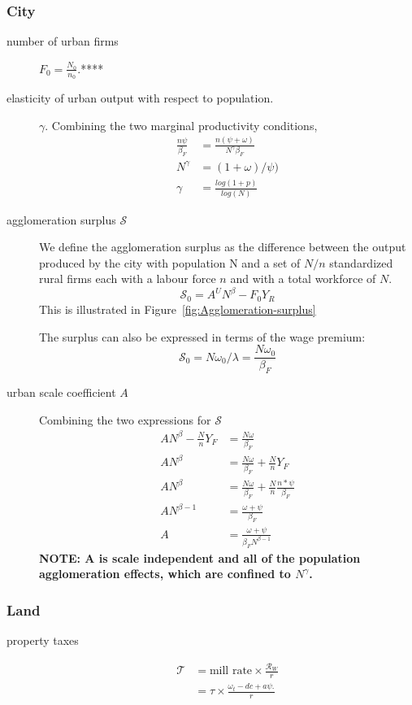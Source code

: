 \subsubsection{City}
\begin{description}

\item[number of urban firms] $F_0=\frac{N_0}{n_0}$.****

\item[elasticity of urban output with respect to population.] $\gamma$. Combining the two marginal productivity conditions, 
\begin{align}
\frac{n\psi}{\beta_F}  &= \frac{n(\psi+\omega)}{N^\gamma \beta_F}  \\
N^\gamma &= (1+\omega)/\psi)\\
\gamma &= \frac{log(1+p)}{log(N)}
\end{align}

\item [agglomeration surplus $\mathcal{S}$] We define the agglomeration surplus as the difference between the output produced by  the city with population N and a set of $N/n$ standardized rural firms each with a labour force $n$ and with a total workforce of $N$. 
\[\mathcal{S_0}=A^U N^\beta-F_0Y_R \] 
This is illustrated in Figure~\ref{fig:Agglomeration-surplus}

The surplus can also be expressed in terms of the wage premium:
\[\mathcal{S_0}=N\omega_0/\lambda=\frac{N\omega_0}{\beta_F}\] 


\item[urban scale coefficient $A$] Combining the two expressions for $\mathcal{S}$
\begin{align*}
 AN^\beta-\frac{N}{n}Y_F    &=\frac{N\omega}{\beta_F}\\ 
 AN^\beta   &=\frac{N\omega}{\beta_F} + \frac{N}{n}Y_F \\
 AN^\beta   &=\frac{N\omega}{\beta_F} + \frac{N}{n}\frac{n*\psi}{\beta_F}\\
AN^{\beta-1}   &=\frac{\omega+\psi}{\beta_F}\\ 
  A&=\frac{\omega+\psi}{\beta_FN^{\beta-1}}
\end{align*}
\textbf{NOTE: A is scale independent and all of the population agglomeration effects, which are confined to $N^\gamma$.}
\end{description}


    \subsubsection{Land}
\begin{description}
\item[property taxes]
\begin{align*}
\mathcal{T} &= \text{mill rate} \times \frac{\mathcal{R}_W}{r} \\
&= \tau \times \frac{\omega_t- {dc} + a\psi.}{r}
\end{align*}


\end{description}

